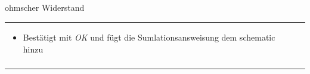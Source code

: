 \begin{frame}[t]{ohmscher Widerstand}
\begin{spacing}{0.9}
\begin{tiny}
\begin{table}[h!]
\begin{tabular}{p{3cm} p{7cm}}
\begin{minipage}{.7\textwidth}
\begin{itemize}
              \item Bestätigt mit \textit{OK} und fügt die Sumlationsansweisung dem schematic hinzu
            \end{itemize}
          \end{minipage}
          \\
                                                & \\
          \hline
        \end{tabular}

      \end{table}

    \end{tiny} \end{spacing}

\end{frame}

